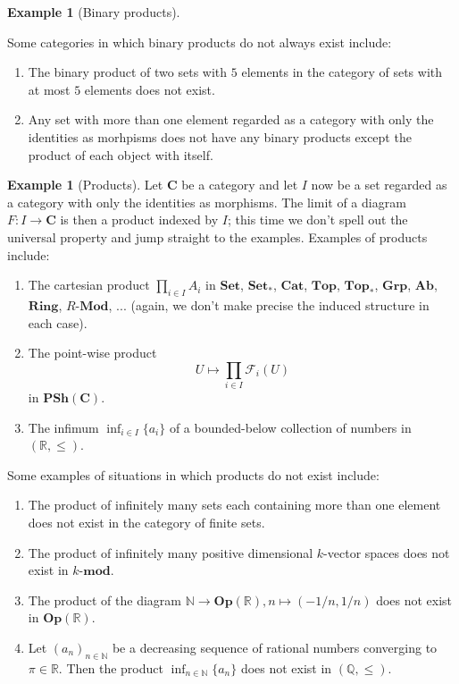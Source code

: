 \documentclass[12pt,reqno,a4paper]{amsart}
\theoremstyle{plain}
\theoremstyle{definition}
\newtheorem{exmp}[thm]{Example}
\theoremstyle{remark}
\begin{document}
\begin{exmp}[Binary products]
\begin{enumerate}
  \end{enumerate}
  Some categories in which binary products do not always exist include:
  \begin{enumerate}
    \item The binary product of two sets with $5$ elements in the category of sets with at most $5$ elements does not exist.
    \item Any set with more than one element regarded as a category with only the identities as morhpisms does not have any binary products except the product of each object with itself.
  \end{enumerate}
\end{exmp}

\begin{exmp}[Products]
  Let $\mathbf{C}$ be a category and let $I$ now be a set regarded as a category with only the identities as morphisms.
  The limit of a diagram $F \colon I \to \mathbf{C}$ is then a product indexed by $I$; this time we don't spell out the universal property and jump straight to the examples.
  Examples of products include:
  \begin{enumerate}
    \item The cartesian product $\prod_{i \in I} A_{i}$ in $\mathbf{Set}$, $\mathbf{Set}_{*}$, $\mathbf{Cat}$, $\mathbf{Top}$, $\mathbf{Top}_{*}$, $\mathbf{Grp}$, $\mathbf{Ab}$, $\mathbf{Ring}$, $R$-$\mathbf{Mod}$, ... (again, we don't make precise the induced structure in each case).
    \item The point-wise product
      \[ U \mapsto \prod_{i \in I} \mathscr{F}_{i}(U) \]
      in $\mathbf{PSh}(\mathbf{C})$.
    \item The infimum $\operatorname{inf}_{i \in I} \{ a_{i} \}$ of a bounded-below collection of numbers in $(\mathbb{R}, \leq)$.
  \end{enumerate}
  Some examples of situations in which products do not exist include:
  \begin{enumerate}
    \item The product of infinitely many sets each containing more than one element does not exist in the category of finite sets.
    \item The product of infinitely many positive dimensional $k$-vector spaces does not exist in $k$-$\mathbf{mod}$.
    \item The product of the diagram $\mathbb{N} \to \mathbf{Op}(\mathbb{R}), n \mapsto (-1/n,1/n)$ does not exist in $\mathbf{Op}(\mathbb{R})$.
    \item Let $(a_{n})_{n \in \mathbb{N}}$ be a decreasing sequence of rational numbers converging to $\pi \in \mathbb{R}$.
      Then the product $\operatorname{inf}_{n \in \mathbb{N}} \{ a_{n} \}$ does not exist in $(\mathbb{Q}, \leq)$.
  \end{enumerate}
\end{exmp}
\end{document}
